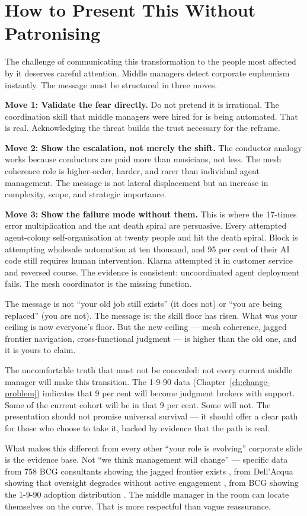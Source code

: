 \section{How to Present This Without Patronising}

The challenge of communicating this transformation to the people most affected by it deserves careful attention. Middle managers detect corporate euphemism instantly. The message must be structured in three moves.

\textbf{Move 1: Validate the fear directly.} Do not pretend it is irrational. The coordination skill that middle managers were hired for is being automated. That is real. Acknowledging the threat builds the trust necessary for the reframe.

\textbf{Move 2: Show the escalation, not merely the shift.} The conductor analogy works because conductors are paid more than musicians, not less. The mesh coherence role is higher-order, harder, and rarer than individual agent management. The message is not lateral displacement but an increase in complexity, scope, and strategic importance.

\textbf{Move 3: Show the failure mode without them.} This is where the 17-times error multiplication and the ant death spiral are persuasive. Every attempted agent-colony self-organisation at twenty people and hit the death spiral. Block is attempting wholesale automation at ten thousand, and 95 per cent of their AI code still requires human intervention. Klarna attempted it in customer service and reversed course. The evidence is consistent: uncoordinated agent deployment fails. The mesh coordinator is the missing function.

\begin{keyinsight}
The message is not ``your old job still exists'' (it does not) or ``you are being replaced'' (you are not). The message is: the skill floor has risen. What was your ceiling is now everyone's floor. But the new ceiling --- mesh coherence, jagged frontier navigation, cross-functional judgment --- is higher than the old one, and it is yours to claim.

The uncomfortable truth that must not be concealed: not every current middle manager will make this transition. The 1-9-90 data (Chapter~\ref{ch:change-problem}) indicates that 9 per cent will become judgment brokers with support. Some of the current cohort will be in that 9 per cent. Some will not. The presentation should not promise universal survival --- it should offer a clear path for those who choose to take it, backed by evidence that the path is real.
\end{keyinsight}

What makes this different from every other ``your role is evolving'' corporate slide is the evidence base. Not ``we think management will change'' --- specific data from 758 BCG consultants showing the jagged frontier exists \parencite{DellAcqua2026}, from Dell'Acqua showing that oversight degrades without active engagement \parencite{DellAcqua2023}, from BCG showing the 1-9-90 adoption distribution \parencite{BCGAgenticShift2025}. The middle manager in the room can locate themselves on the curve. That is more respectful than vague reassurance.
